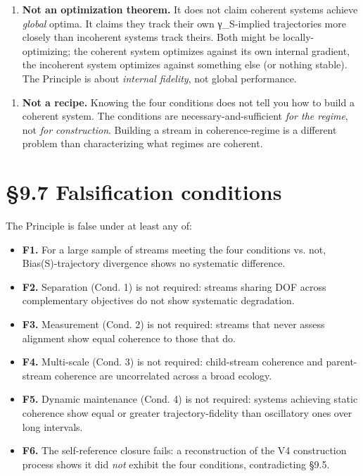 \documentclass[11pt, openany]{book}
\newcommand{\sectionbreak}{\clearpage}
\begin{document}
\begin{enumerate}
\item \textbf{Not an optimization theorem.} It does not claim coherent systems achieve \textit{global} optima. It claims they track their own γ\_\allowbreak{}S-implied trajectories more closely than incoherent systems track theirs. Both might be locally-optimizing; the coherent system optimizes against its own internal gradient, the incoherent system optimizes against something else (or nothing stable). The Principle is about \textit{internal fidelity}, not global performance.
\end{enumerate}

\begin{enumerate}
\item \textbf{Not a recipe.} Knowing the four conditions does not tell you how to build a coherent system. The conditions are necessary-and-sufficient \textit{for the regime}, not \textit{for construction}. Building a stream in coherence-regime is a different problem than characterizing what regimes are coherent.
\end{enumerate}

\sectionbreak

\section{§9.7 Falsification conditions}

The Principle is false under at least any of:

\begin{itemize}
\item \textbf{F1.} For a large sample of streams meeting the four conditions vs. not, Bias(S)-trajectory divergence shows no systematic difference.
\item \textbf{F2.} Separation (Cond. 1) is not required: streams sharing DOF across complementary objectives do not show systematic degradation.
\item \textbf{F3.} Measurement (Cond. 2) is not required: streams that never assess alignment show equal coherence to those that do.
\item \textbf{F4.} Multi-scale (Cond. 3) is not required: child-stream coherence and parent-stream coherence are uncorrelated across a broad ecology.
\item \textbf{F5.} Dynamic maintenance (Cond. 4) is not required: systems achieving static coherence show equal or greater trajectory-fidelity than oscillatory ones over long intervals.
\item \textbf{F6.} The self-reference closure fails: a reconstruction of the V4 construction process shows it did \textit{not} exhibit the four conditions, contradicting §9.5.
\end{itemize}
\end{document}
